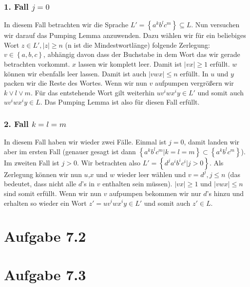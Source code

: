 \documentclass{article}
\begin{document}
\subsubsection*{1. Fall $j=0$}
In diesem Fall betrachten wir die Sprache $L'=\left\{a^kb^lc^m\right\} \subseteq L$. Nun versuchen wir darauf das Pumping Lemma anzuwenden. Dazu wählen wir für ein beliebiges Wort $z\in L',|z|\geq n$ (n ist die Mindestwortlänge) folgende Zerlegung: $v\in \left\{a,b,c\right\}$, abhängig davon dass der Buchstabe in dem Wort das wir gerade betrachten vorkommt. $x$ lassen wir komplett leer. Damit ist $|vx| \geq 1$ erfüllt. $w$ können wir ebenfalls leer lassen. Damit ist auch $|vwx| \leq n$ erfüllt. In $u$ und $y$ packen wir die Reste des Wortes. Wenn wir nun $v$ aufpumpen vergrößern wir $k \vee l \vee m$. Für das entstehende Wort gilt weiterhin $uv^iwx^iy \in L'$ und somit auch $uv^iwx^iy \in L$. Das Pumping Lemma ist also für diesen Fall erfüllt.

\subsubsection*{2. Fall $k=l=m$}
In diesem Fall haben wir wieder zwei Fälle. Einmal ist $j=0$, damit landen wir aber im ersten Fall (genauer gesagt ist dann $\left\{a^kb^lc^m|k=l=m\right\} \subset \left\{a^kb^lc^m\right\}$). Im zweiten Fall ist $j>0$. Wir betrachten also $L'=\left\{d^ja^ib^ic^i|j>0\right\}$. Als Zerlegung können wir nun $u$,$x$ und $w$ wieder leer wählen und $v=d^j, j\leq n$ (das bedeutet, dass nicht alle $d$'s in $v$ enthalten sein müssen). $|vx| \geq 1$ und $|vwx| \leq n$ sind somit erfüllt. Wenn wir nun $v$ aufpumpen bekommen wir nur $d$'s hinzu und erhalten so wieder ein Wort $z' = uv^iwx^iy \in L'$ und somit auch $z' \in L$.


\section*{Aufgabe 7.2}



\section*{Aufgabe 7.3}
\end{document}
